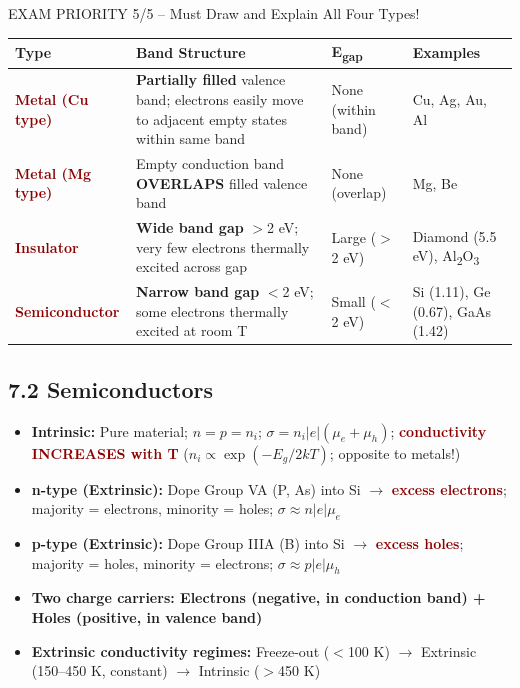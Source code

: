 \documentclass[11pt,a4paper]{article}
\newcommand{\mysubsec}[1]{\subsection*{#1}}
\newcommand{\CRIT}[1]{\textcolor{DarkRed}{\textbf{#1}}}
\newcommand{\KEY}[1]{\textcolor{SecondaryDark}{\textbf{#1}}}
\newcommand{\HI}[1]{\colorbox{yellow!20}{\textcolor{DarkPurple}{\textbf{#1}}}}
\begin{document}
\begin{critbox}{EXAM PRIORITY 5/5 -- Must Draw and Explain All Four Types!}
\renewcommand{\arraystretch}{1.35}
\begin{tabular}{p{2.3cm} p{5.5cm} p{2.4cm} p{3.2cm}}
\toprule
\textbf{Type} & \textbf{Band Structure} & \textbf{E\textsubscript{gap}} & \textbf{Examples} \\
\midrule
\CRIT{Metal (Cu type)}  & \textbf{Partially filled} valence band; electrons easily move to adjacent empty states within same band & None (within band) & Cu, Ag, Au, Al \\
\CRIT{Metal (Mg type)}  & Empty conduction band \textbf{OVERLAPS} filled valence band & None (overlap) & Mg, Be \\
\CRIT{Insulator}   & \textbf{Wide band gap} $>$2 eV; very few electrons thermally excited across gap & Large ($>$2 eV) & Diamond (5.5 eV), Al\textsubscript{2}O\textsubscript{3} \\
\CRIT{Semiconductor}& \textbf{Narrow band gap} $<$2 eV; some electrons thermally excited at room T & Small ($<$2 eV) & Si (1.11), Ge (0.67), GaAs (1.42) \\
\bottomrule
\end{tabular}
\end{critbox}

\mysubsec{7.2 Semiconductors}
\begin{itemize}[leftmargin=*,nosep]
    \item \KEY{Intrinsic:} Pure material; $n = p = n_i$; $\sigma = n_i|e|(\mu_e+\mu_h)$; \CRIT{conductivity INCREASES with T} ($n_i \propto \exp(-E_g/2kT)$; opposite to metals!)
    \item \KEY{n-type (Extrinsic):} Dope Group VA (P, As) into Si $\to$ \CRIT{excess electrons}; majority = electrons, minority = holes; $\sigma \approx n|e|\mu_e$
    \item \KEY{p-type (Extrinsic):} Dope Group IIIA (B) into Si $\to$ \CRIT{excess holes}; majority = holes, minority = electrons; $\sigma \approx p|e|\mu_h$
    \item \HI{Two charge carriers: Electrons (negative, in conduction band) + Holes (positive, in valence band)}
    \item \textbf{Extrinsic conductivity regimes:} Freeze-out ($<$100 K) $\to$ Extrinsic (150--450 K, constant) $\to$ Intrinsic ($>$450 K)
\end{itemize}
\end{document}
